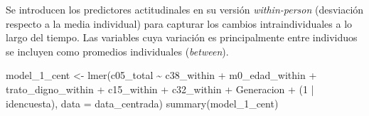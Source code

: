 \documentclass[
  spanish,
  a4paper,
  oneside]{scrbook}
\newenvironment{Shaded}{\begin{snugshade}}{\end{snugshade}}
\newcommand{\AttributeTok}[1]{\textcolor[rgb]{0.40,0.45,0.13}{#1}}
\newcommand{\DecValTok}[1]{\textcolor[rgb]{0.68,0.00,0.00}{#1}}
\newcommand{\FunctionTok}[1]{\textcolor[rgb]{0.28,0.35,0.67}{#1}}
\newcommand{\NormalTok}[1]{\textcolor[rgb]{0.00,0.23,0.31}{#1}}
\newcommand{\OtherTok}[1]{\textcolor[rgb]{0.00,0.23,0.31}{#1}}
\newcommand{\SpecialCharTok}[1]{\textcolor[rgb]{0.37,0.37,0.37}{#1}}
\begin{document}
Se introducen los predictores actitudinales en su versión
\emph{within-person} (desviación respecto a la media individual) para
capturar los cambios intraindividuales a lo largo del tiempo. Las
variables cuya variación es principalmente entre individuos se incluyen
como promedios individuales (\emph{between}).

\begin{Shaded}
\begin{Highlighting}[]
\NormalTok{model\_1\_cent }\OtherTok{\textless{}{-}} \FunctionTok{lmer}\NormalTok{(c05\_total }\SpecialCharTok{\textasciitilde{}} 
\NormalTok{                       c38\_within }\SpecialCharTok{+}
\NormalTok{                       m0\_edad\_within }\SpecialCharTok{+}
\NormalTok{                       trato\_digno\_within }\SpecialCharTok{+}
\NormalTok{                       c15\_within }\SpecialCharTok{+}
\NormalTok{                       c32\_within }\SpecialCharTok{+}
\NormalTok{                       Generacion }\SpecialCharTok{+} 
\NormalTok{                       (}\DecValTok{1} \SpecialCharTok{|}\NormalTok{ idencuesta), }\AttributeTok{data =}\NormalTok{ data\_centrada)}
\FunctionTok{summary}\NormalTok{(model\_1\_cent)}
\end{Highlighting}
\end{Shaded}
\end{document}
